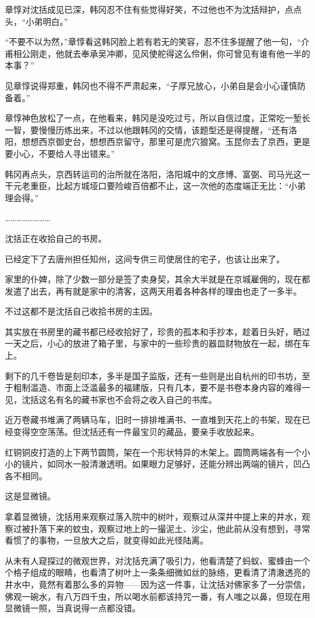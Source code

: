 章惇对沈括成见已深，韩冈忍不住有些觉得好笑，不过他也不为沈括辩护，点点头，“小弟明白。”

“不要不以为然，”章惇看这韩冈脸上若有若无的笑容，忍不住多提醒了他一句，“介甫相公刚走，他就去奉承吴冲卿，见风使舵得这么伶俐，你可曾见有谁有他一半的本事？”

见章惇说得郑重，韩冈也不得不严肃起来，“子厚兄放心，小弟自是会小心谨慎防备着。”

章惇神色放松了一点，在他看来，韩冈是没吃过亏，所以自信过度，正常吃一堑长一智，要慢慢历练出来，不过以他跟韩冈的交情，该题型还是得提醒，“还有洛阳，想想西京御史台，想想西京留守，那里可是虎穴狼窝。玉昆你去了京西，更是要小心，不要给人寻出错来。”

韩冈再点头，京西转运司的治所就在洛阳，洛阳城中的文彦博、富弼、司马光这一干元老重臣，比起方城垭口要险峻百倍都不止，这一次他的态度端正无比：“小弟理会得。”

……………………

沈括正在收拾自己的书房。

已经定下了去唐州担任知州，这间专供三司使居住的宅子，也该让出来了。

家里的仆婢，除了少数一部分是签了卖身契，其余大半就是在京城雇佣的，现在都发遣了出去，再有就是家中的清客，这两天用着各种各样的理由也走了一多半。

不过这都不是沈括自己收拾书房的主因。

其实放在书房里的藏书都已经收拾好了，珍贵的孤本和手抄本，趁着日头好，晒过一天之后，小心的放进了箱子里，与家中的一些珍贵的器皿财物放在一起，绑在车上。

剩下的几千卷皆是刻印本，多半是国子监版，还有一些则是出自杭州的印书坊，至于粗制滥造、市面上泛滥最多的福建版，只有几本，要不是书卷本身内容的难得一见，沈括这名有名的藏书家也不会将之收入自己的书库。

近万卷藏书堆满了两辆马车，旧时一排排堆满书、一直堆到天花上的书架，现在已经变得空空荡荡。但沈括还有一件最宝贝的藏品，要亲手收放起来。

红铜铜皮打造的上下两节圆筒，架在一个形状特异的木架上。圆筒两端各有一个小小的镜片，如同水一般清澈透明。如果眼力足够好，还能分辨出两端的镜片，凹凸各不相同。

这是显微镜。

拿着显微镜，沈括用来观察过落入院中的树叶，观察过从深井中提上来的井水，观察过被扑落下来的蚊虫，观察过地上的一撮泥土、沙尘，他此前从没有想到，寻常看惯了的事物，一旦放大之后，就变得如此光怪陆离。

从未有人窥探过的微观世界，对沈括充满了吸引力，他看清楚了蚂蚁、蜜蜂由一个个格子组成的眼睛，也看清了树叶上一条条细微如丝的脉络，更看清了清澈透亮的井水中，竟然有着那么多的异物——因为这一件事，让沈括对佛家多了一分崇信，佛观一碗水，有八万四千虫，所以喝水前都该持咒一番，有人嗤之以鼻，但现在用显微镜一照，当真说得一点都没错。

